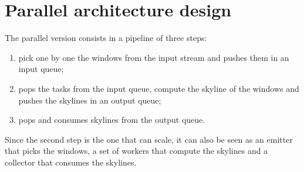 \section{Parallel architecture design}

The parallel version consists in a pipeline of three steps:
\begin{enumerate}
    \item pick one by one the windows from the input stream and pushes them in an input queue;
    \item pops the tasks from the input queue, compute the skyline of the windows and pushes the skylines in an output queue;
    \item pops and consumes skylines from the output queue.
\end{enumerate}

\noindent
Since the second step is the one that can scale, it can also be seen as an emitter that picks the windows, a set of workers that compute the skylines and a collector that consumes the skylines.

\bigskip\noindent
\begin{figure}[h]
    \centering
    
    \bigskip
\end{figure}